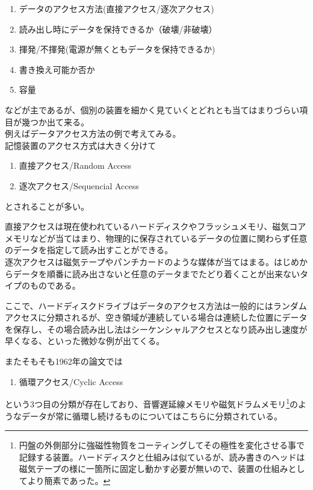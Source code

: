 \documentclass[a4paper,report]{jsbook}
\begin{document}
\begin{enumerate}
\def\labelenumi{\arabic{enumi}.}
\tightlist
\item
  データのアクセス方法(直接アクセス/逐次アクセス)
\item
  読み出し時にデータを保持できるか（破壊/非破壊）
\item
  揮発/不揮発(電源が無くともデータを保持できるか)
\item
  書き換え可能か否か
\item
  容量
\end{enumerate}

などが主であるが、個別の装置を細かく見ていくとどれとも当てはまりづらい項目が幾つか出て来る。\\
例えばデータアクセス方法の例で考えてみる。\\
記憶装置のアクセス方式は大きく分けて

\begin{enumerate}
\def\labelenumi{\arabic{enumi}.}
\tightlist
\item
  直接アクセス/Random Access
\item
  逐次アクセス/Sequencial Access
\end{enumerate}

とされることが多い。

直接アクセスは現在使われているハードディスクやフラッシュメモリ、磁気コアメモリなどが当てはまり、物理的に保存されているデータの位置に関わらず任意のデータを指定して読み出すことができる。\\
逐次アクセスは磁気テープやパンチカードのような媒体が当てはまる。はじめからデータを順番に読み出さないと任意のデータまでたどり着くことが出来ないタイプのものである。

ここで、ハードディスクドライブはデータのアクセス方法は一般的にはランダムアクセスに分類されるが、空き領域が連続している場合は連続した位置にデータを保存し、その場合読み出し法はシーケンシャルアクセスとなり読み出し速度が早くなる、といった微妙な例が出てくる。

またそもそも1962年の論文では

\begin{enumerate}
\def\labelenumi{\arabic{enumi}.}
\tightlist
\item
  循環アクセス/Cyclic Access
\end{enumerate}

という3つ目の分類が存在しており、音響遅延線メモリや磁気ドラムメモリ\footnote{円盤の外側部分に強磁性物質をコーティングしてその極性を変化させる事で記録する装置。ハードディスクと仕組みは似ているが、読み書きのヘッドは磁気テープの様に一箇所に固定し動かす必要が無いので、装置の仕組みとしてより簡素であった。}のようなデータが常に循環し続けるものについてはこちらに分類されている\autocite{ishii:memory}。
\end{document}
